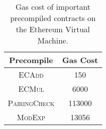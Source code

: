 \begin{table}
\centering
\begin{tabular}{|c|c|}
\hline
Precompile & Gas Cost \\
\hline
\hline
\textsc{ECAdd} & 150 \\
\textsc{ECMul} & 6000 \\
\textsc{PairingCheck} &  113000 \\
\textsc{ModExp} & 13056 \\
\hline
\end{tabular}
\caption[EVM Gas Cost]{Gas cost of important precompiled contracts on the
    Ethereum Virtual Machine.}
\label{tab:evm_gas_cost}
\end{table}
